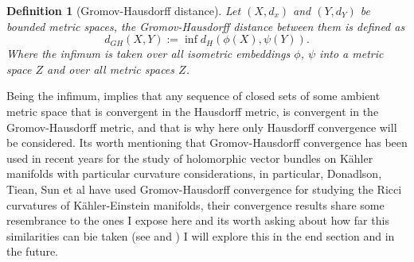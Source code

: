 \documentclass[12pt,twoside,a4paper]{report}
\newtheorem{definition}{Definition}[section]
\begin{document}
  \begin{definition}[Gromov-Hausdorff distance]\label{Gromov-Hausdorff}
    Let $(X,d_{x})$ and $(Y,d_{Y})$ be bounded metric spaces, the Gromov-Hausdorff distance between them is defined as
    \begin{equation}
      d_{GH}(X,Y):=\inf d_{H}(\phi(X),\psi(Y)).
    \end{equation}
    Where the infimum is taken over all isometric embeddings $\phi$, $\psi$ into a metric space $Z$ and over all metric spaces $Z$.
  \end{definition}
  Being the infimum, implies that any sequence of closed sets of some ambient metric space that is convergent in the Hausdorff metric, is convergent in the Gromov-Hausdorff metric, and that is why here only Hausdorff convergence will be considered. Its worth mentioning that Gromov-Hausdorff convergence has been used in recent years for the study of holomorphic vector bundles on Kähler manifolds with particular curvature considerations, in particular, Donadlson, Tiean, Sun et al have used Gromov-Hausdorff convergence for studying the Ricci curvatures of Kähler-Einstein manifolds, their convergence results share some resembrance to the ones I expose here and its worth asking about how far this similarities can bie taken (see \cite{Donadlson-Sun} and \cite{tian}) I will explore this in the end section and in the future.
\end{document}
